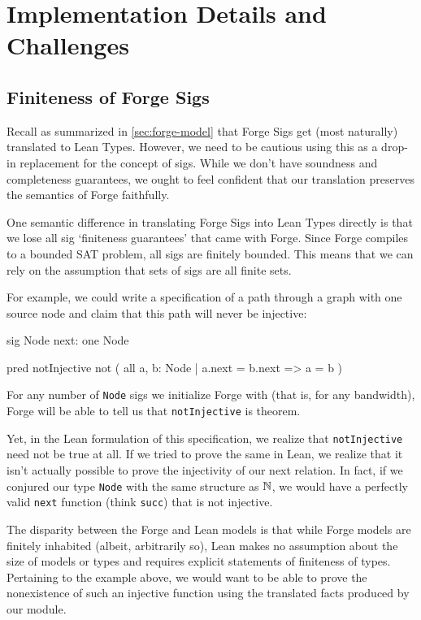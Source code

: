 \section{Implementation Details and Challenges}

\subsection{Finiteness of Forge Sigs}\label{sec:finiteness}
Recall as summarized in \cref{sec:forge-model} that Forge Sigs get (most naturally) translated to Lean Types. However, we need to be cautious using this as a drop-in replacement for the concept of sigs. While we don't have soundness and completeness guarantees, we ought to feel confident that our translation preserves the semantics of Forge faithfully. 

One semantic difference in translating Forge Sigs into Lean Types directly is that we lose all sig `finiteness guarantees' that came with Forge. Since Forge compiles to a bounded SAT problem, all sigs are finitely bounded. This means that we can rely on the assumption that sets of sigs are all finite sets. 

For example, we could write a specification of a path through a graph with one source node and claim that this path will never be injective:
\begin{forge*}
sig Node {
  next: one Node
}

pred notInjective {
  not ( all a, b: Node | 
    a.next = b.next => a = b )
}
\end{forge*}
For any number of \texttt{Node} sigs we initialize Forge with (that is, for any bandwidth), Forge will be able to tell us that \texttt{notInjective} is theorem. 

Yet, in the Lean formulation of this specification, we realize that \texttt{notInjective} need not be true at all. If we tried to prove the same in Lean, we realize that it isn't actually possible to prove the injectivity of our next relation. In fact, if we conjured our type \texttt{Node} with the same structure as $\mathbb N$, we would have a perfectly valid \texttt{next} function (think \texttt{succ}) that is not injective. 

The disparity between the Forge and Lean models is that while Forge models are finitely inhabited (albeit, arbitrarily so), Lean makes no assumption about the size of models or types and requires explicit statements of finiteness of types. Pertaining to the example above, we would want to be able to prove the nonexistence of such an injective function using the translated facts produced by our module. 

